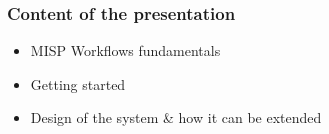 
\begin{frame}[t,plain]
\titlepage
\end{frame}

\begin{frame}
    \frametitle{Content of the presentation}
    \begin{itemize}
        \item MISP Workflows fundamentals
        \item Getting started
        \item Design of the system \& how it can be extended
    \end{itemize}

    \begin{center}
    \end{center}
\end{frame}

